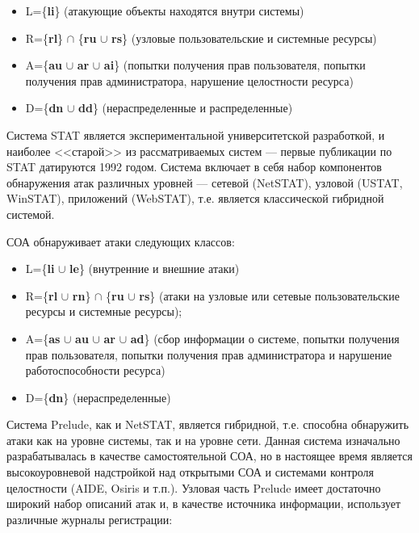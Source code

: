 \begin{itemize}

\item L=\{\textbf{li}\} (атакующие объекты находятся внутри системы)
\item R=\{\textbf{rl}\} $\cap$ \{\textbf{ru} $\cup$ \textbf{rs}\} (узловые пользовательские и системные ресурсы)
\item A=\{\textbf{au} $\cup$ \textbf{ar} $\cup$ \textbf{ai}\} (попытки получения прав пользователя, попытки
получения прав администратора, нарушение целостности ресурса)
\item D=\{\textbf{dn} $\cup$ \textbf{dd}\} (нераспределенные и распределенные)

\end{itemize}

Система STAT является экспериментальной университетской разработкой, и
наиболее <<старой>> из рассматриваемых систем --- первые публикации по STAT
датируются 1992 годом. Система включает в себя набор компонентов обнаружения
атак различных уровней --- сетевой (NetSTAT), узловой (USTAT, WinSTAT),
приложений (WebSTAT), т.е. является классической гибридной системой.

СОА обнаруживает атаки следующих классов:

\begin{itemize}

\item L=\{\textbf{li} $\cup$ \textbf{le}\} (внутренние и внешние атаки)
\item R=\{\textbf{rl} $\cup$ \textbf{rn}\} $\cap$ \{\textbf{ru} $\cup$ \textbf{rs}\} (атаки на узловые или сетевые пользовательские
ресурсы и системные ресурсы);
\item A=\{\textbf{as} $\cup$ \textbf{au} $\cup$ \textbf{ar} $\cup$ \textbf{ad}\} (сбор информации о системе, попытки получения
прав пользователя, попытки получения прав администратора и нарушение
работоспособности ресурса)
\item D=\{\textbf{dn}\} (нераспределенные)

\end{itemize}

Система Prelude, как и NetSTAT, является гибридной, т.е. способна обнаружить
атаки как на уровне системы, так и на уровне сети. Данная система изначально
разрабатывалась в качестве самостоятельной СОА, но в настоящее время является
высокоуровневой надстройкой над открытыми СОА и системами контроля целостности
(AIDE, Osiris и т.п.). Узловая часть Prelude имеет достаточно широкий набор описаний
атак и, в качестве источника информации, использует различные журналы регистрации:

